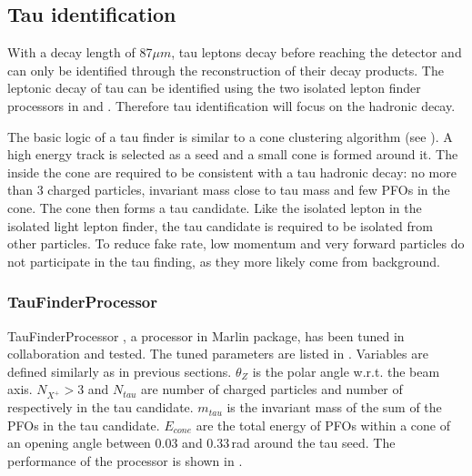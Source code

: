 \subsection{Tau identification}

With a decay length of 87$\mu{m}$, tau leptons decay before reaching the detector and can only be identified through the reconstruction of their decay products. The leptonic decay of tau can be identified using the two isolated lepton finder processors in  and  . Therefore tau identification will focus on the hadronic decay.

The basic logic of a tau finder is similar to a cone clustering algorithm (see  ). A high energy track is selected as a seed and a small cone is formed around it. The \PFOs inside the cone are required to be consistent with a tau hadronic decay: no more than 3 charged particles, invariant mass close to tau mass and few PFOs in the cone. The cone then forms a tau candidate. Like the isolated lepton in the isolated light lepton finder, the tau candidate is required to be isolated from other particles. To reduce fake rate, low momentum and very forward particles do not participate in the tau finding, as they more likely come from \ggHad background.

\subsubsection{TauFinderProcessor}


TauFinderProcessor \cite{LCD-Note-2010-009}, a processor in Marlin package, has been tuned in collaboration and tested. The tuned parameters are listed in . Variables are defined similarly as in previous sections. $\theta_Z$ is the polar angle w.r.t. the beam axis. $N_{X^+} > 3$ and $N_{tau}$ are number of charged particles and number of \PFOs respectively in the tau candidate. $m_{tau}$ is the invariant mass of the sum of the PFOs in the tau candidate. $E_{cone}$ are the total energy of PFOs within a cone of an opening angle between 0.03 and 0.33\,rad  around the tau seed. The performance of the processor is shown in .


